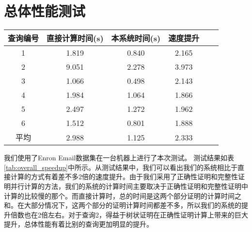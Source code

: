 \section {总体性能测试}

\begin{table}[htb]
    \centering
    \begin{tabular}{cccccc}
        \toprule
        查询编号 & 直接计算时间(s) & 本系统时间(s) & 速度提升 \\
        \midrule
        1 & 1.819 & 0.840 & 2.165 \\
        2 & 9.051 & 2.278 & 3.973 \\
        3 & 1.066 & 0.498 & 2.143 \\
        4 & 1.984 & 1.064 & 1.866 \\
        5 & 2.497 & 1.272 & 1.962 \\
        6 & 1.512 & 0.801 & 1.888 \\
        \midrule
        平均 & 2.988 & 1.125 & 2.333 \\
        \bottomrule
    \end{tabular}
\end{table}

我们使用了Enron Email数据集在一台机器上进行了本次测试。
测试结果如表\ref{tab:overall_speedup}中所示。从测试结果中，我们可以看出我们的系统相比于直接计算的方式有着差不多2倍的速度提升。由于我们采用了正确性证明和完整性证明并行计算的方法，我们的系统的计算时间主要取决于正确性证明和完整性证明中计算的比较慢的那个。而直接计算时，总的时间是这两个部分证明的计算时间之和。在大部分情况下，这两个部分的证明计算时间都差不多，所以我们的系统的提升倍数也在2倍左右。对于查询2，得益于树状证明在正确性证明计算上带来的巨大提升，总体性能有着比别的查询更加明显的提升。

